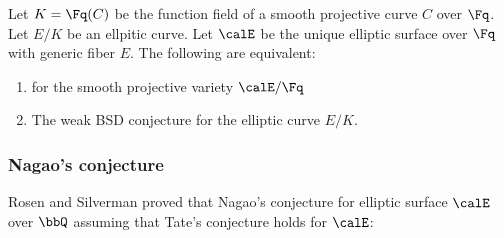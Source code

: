 \begin{theorem}
    Let $K = \Fq(C)$ be the function field of a smooth projective curve $C$ over $\Fq$. Let $E/K$ be an ellpitic curve. Let $\calE$ be the unique elliptic surface over $\Fq$ with generic fiber $E$.  
    The following are equivalent:
    \begin{enumerate}
        \item {} for the smooth projective variety $\calE/\Fq$
        \item The weak BSD conjecture for the elliptic curve $E/K$. 
    \end{enumerate}
\end{theorem}


\subsubsection{Nagao's conjecture}






Rosen and Silverman proved that Nagao's conjecture for elliptic surface $\calE$ over $\bbQ$ assuming that Tate's conjecture holds for $\calE$:
\begin{theorem}
\end{theorem}





